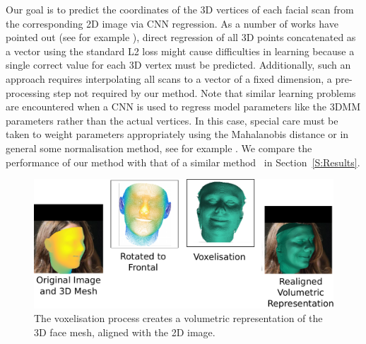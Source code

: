 Our goal is to predict the coordinates of the 3D vertices of each
facial scan from the corresponding 2D image via CNN regression. As a
number of works have pointed out (see for example
\cite{tompson2015efficient, pfister2015flowing}), direct regression of
all 3D points concatenated as a vector using the standard L2 loss
might cause difficulties in learning because a single correct value
for each 3D vertex must be predicted. Additionally, such an approach
requires interpolating all scans to a vector of a fixed dimension, a
pre-processing step not required by our method. Note that similar
learning problems are encountered when a CNN is used to regress model
parameters like the 3DMM parameters rather than the actual
vertices. In this case, special care must be taken to weight
parameters appropriately using the Mahalanobis distance or in general
some normalisation method, see for example \cite{zhu2016face}. We
compare the performance of our method with that of a similar
method~\cite{zhu2016face} in Section~\ref{S:Results}.

\begin{figure}
  \centering
  \includegraphics[width=0.9\linewidth]{img/discretisation.pdf}

  \caption[Dataset voxelisation procedure]{The voxelisation process
    creates a volumetric representation of the 3D face mesh, aligned
    with the 2D image.}
  \label{fig:discretisation}
\end{figure}

